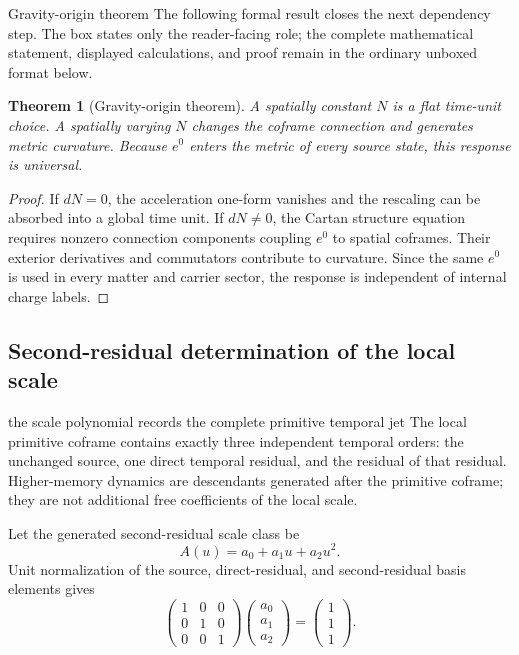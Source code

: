 \documentclass[11pt]{article}
\numberwithin{equation}{section}
\newtheorem{theorem}[definition]{Theorem}
\theoremstyle{remark}
\begin{document}
\begin{proofguide}{Gravity-origin theorem}
The following formal result closes the next dependency step. The box states only the reader-facing role; the complete mathematical statement, displayed calculations, and proof remain in the ordinary unboxed format below.
\end{proofguide}
\begin{theorem}[Gravity-origin theorem]
A spatially constant $N$ is a flat time-unit choice. A spatially varying $N$ changes the coframe connection and generates metric curvature. Because $e^0$ enters the metric of every source state, this response is universal.
\end{theorem}
\begin{proof}
If $dN=0$, the acceleration one-form vanishes and the rescaling can be absorbed into a global time unit. If $dN\neq0$, the Cartan structure equation requires nonzero connection components coupling $e^0$ to spatial coframes. Their exterior derivatives and commutators contribute to curvature. Since the same $e^0$ is used in every matter and carrier sector, the response is independent of internal charge labels.
\end{proof}



\subsection{Second-residual determination of the local scale}
\begin{interpretivebridge}{the scale polynomial records the complete primitive temporal jet}
The local primitive coframe contains exactly three independent temporal orders: the unchanged source, one direct temporal residual, and the residual of that residual. Higher-memory dynamics are descendants generated after the primitive coframe; they are not additional free coefficients of the local scale.
\end{interpretivebridge}

Let the generated second-residual scale class be
\begin{equation}
A(u)=a_0+a_1u+a_2u^2.
\end{equation}
Unit normalization of the source, direct-residual, and second-residual basis elements gives
\begin{equation}
\begin{pmatrix}
1&0&0\\0&1&0\\0&0&1
\end{pmatrix}
\begin{pmatrix}a_0\\a_1\\a_2\end{pmatrix}
=
\begin{pmatrix}1\\1\\1\end{pmatrix}.
\end{equation}
\end{document}
